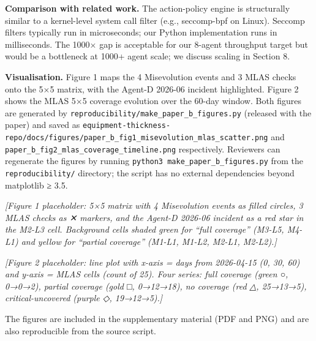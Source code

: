 \textbf{Comparison with related work.} The action-policy engine is
structurally similar to a kernel-level system call filter (e.g.,
seccomp-bpf on Linux). Seccomp filters typically run in microseconds;
our Python implementation runs in milliseconds. The 1000× gap is
acceptable for our 8-agent throughput target but would be a bottleneck
at 1000+ agent scale; we discuss scaling in Section 8.

\textbf{Visualisation.} Figure 1 maps the 4 Misevolution events and 3
MLAS checks onto the 5×5 matrix, with the Agent-D 2026-06 incident
highlighted. Figure 2 shows the MLAS 5×5 coverage evolution over the
60-day window. Both figures are generated by
\texttt{reproducibility/make\_paper\_b\_figures.py} (released with the
paper) and saved as
\texttt{equipment-thickness-repo/docs/figures/paper\_b\_fig1\_misevolution\_mlas\_scatter.png}
and \texttt{paper\_b\_fig2\_mlas\_coverage\_timeline.png} respectively.
Reviewers can regenerate the figures by running
\texttt{python3\ make\_paper\_b\_figures.py} from the
\texttt{reproducibility/} directory; the script has no external
dependencies beyond matplotlib ≥ 3.5.

\emph{{[}Figure 1 placeholder: 5×5 matrix with 4 Misevolution events as
filled circles, 3 MLAS checks as ✕ markers, and the Agent-D 2026-06
incident as a red star in the M2-L3 cell. Background cells shaded green
for ``full coverage'' (M3-L5, M4-L1) and yellow for ``partial coverage''
(M1-L1, M1-L2, M2-L1, M2-L2).{]}}

\emph{{[}Figure 2 placeholder: line plot with x-axis = days from
2026-04-15 (0, 30, 60) and y-axis = MLAS cells (count of 25). Four
series: full coverage (green ○, 0→0→2), partial coverage (gold □,
0→12→18), no coverage (red △, 25→13→5), critical-uncovered (purple ◇,
19→12→5).{]}}

The figures are included in the supplementary material (PDF and PNG) and
are also reproducible from the source script.

